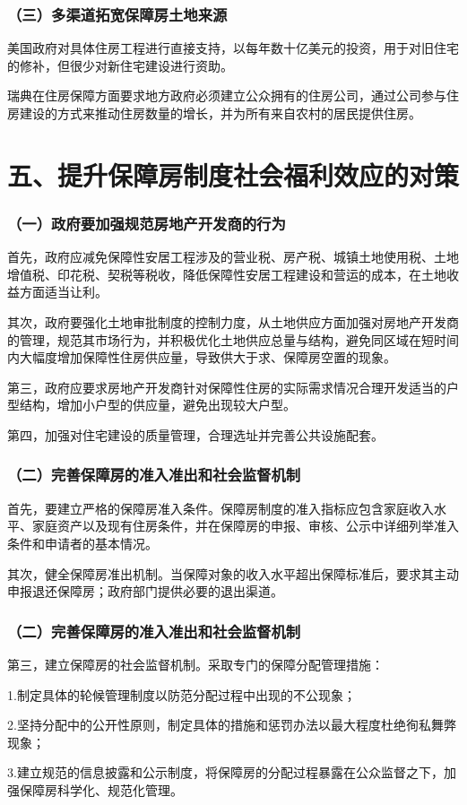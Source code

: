 \documentclass[aspectratio=169, 12pt]{beamer}
\begin{document}
\begin{frame}[plain]
    \frametitle{（三）多渠道拓宽保障房土地来源}
    美国政府对具体住房工程进行直接支持，以每年数十亿美元的投资，用于对旧住宅的修补，但很少对新住宅建设进行资助。
    \par
    瑞典在住房保障方面要求地方政府必须建立公众拥有的住房公司，通过公司参与住房建设的方式来推动住房数量的增长，并为所有来自农村的居民提供住房。
\end{frame}

\section{五、提升保障房制度社会福利效应的对策}

\begin{frame}[plain]
    \frametitle{（一）政府要加强规范房地产开发商的行为}
    首先，政府应减免保障性安居工程涉及的营业税、房产税、城镇土地使用税、土地增值税、印花税、契税等税收，降低保障性安居工程建设和营运的成本，在土地收益方面适当让利。
    \par
    其次，政府要强化土地审批制度的控制力度，从土地供应方面加强对房地产开发商的管理，规范其市场行为，并积极优化土地供应总量与结构，避免同区域在短时间内大幅度增加保障性住房供应量，导致供大于求、保障房空置的现象。
    \par
    第三，政府应要求房地产开发商针对保障性住房的实际需求情况合理开发适当的户型结构，增加小户型的供应量，避免出现较大户型。
    \par
    第四，加强对住宅建设的质量管理，合理选址并完善公共设施配套。
\end{frame}

\begin{frame}[plain]
    \frametitle{（二）完善保障房的准入准出和社会监督机制}
    首先，要建立严格的保障房准入条件。保障房制度的准入指标应包含家庭收入水平、家庭资产以及现有住房条件，并在保障房的申报、审核、公示中详细列举准入条件和申请者的基本情况。
    \par
    其次，健全保障房准出机制。当保障对象的收入水平超出保障标准后，要求其主动申报退还保障房；政府部门提供必要的退出渠道。
\end{frame}

\begin{frame}[plain]
    \frametitle{（二）完善保障房的准入准出和社会监督机制}
    第三，建立保障房的社会监督机制。采取专门的保障分配管理措施：
    \par
    1.制定具体的轮候管理制度以防范分配过程中出现的不公现象；
    \par
    2.坚持分配中的公开性原则，制定具体的措施和惩罚办法以最大程度杜绝徇私舞弊现象；
    \par
    3.建立规范的信息披露和公示制度，将保障房的分配过程暴露在公众监督之下，加强保障房科学化、规范化管理。
\end{frame}
\end{document}
